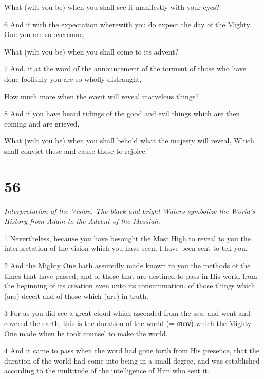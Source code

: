 \par What (wilt you be) when you shall see it manifestly with your eyes?

\par 6 And if with the expectation wherewith you do expect the day of the Mighty One you are so overcome,

\par What (wilt you be) when you shall come to its advent?

\par 7 And, if at the word of the announcement of the torment of those who have done foolishly you are so wholly distraught,

\par How much more when the event will reveal marvelous things?

\par 8 And if you have heard tidings of the good and evil things which are then coming and are grieved,

\par What (wilt you be) when you shall behold what the majesty will reveal, Which shall convict these and cause those to rejoice.’

\chapter{56}

\par \textit{Interpretation of the Vision. The black and bright Waters symbolize the World's History from Adam to the Advent of the Messiah.}


\par 1 Nevertheless, because you have besought the Most High to reveal to you the interpretation of the vision which you have seen, I have been sent to tell you. 

\par 2 And the Mighty One hath assuredly made known to you the methods of the times that have passed, and of those that are destined to pass in His world from the beginning of its creation even unto its consummation, of those things which (are) deceit and of those which (are) in truth. 

\par 3 For as you did see a great cloud which ascended from the sea, and went and covered the earth, this is the duration of the world (= αιων) which the Mighty One made when he took counsel to make the world. 

\par 4 And it came to pass when the word had gone forth from His presence, that the duration of the world had come into being in a small degree, and was established according to the multitude of the intelligence of Him who sent it. 

